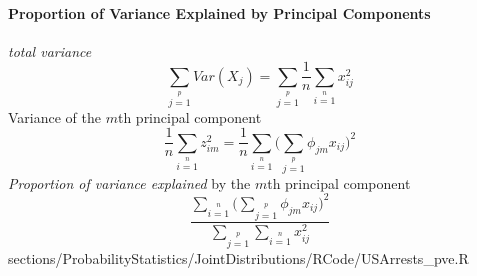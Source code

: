 {	\paragraph{Proportion of Variance Explained by Principal Components}
	\RTheory
	{
	\textit{total variance}
	$$
	\sum\limits_{j=1}\limits^{p} Var(X_j)=\sum\limits_{j=1}\limits^{p}\frac{1}{n}\sum\limits_{i=1}\limits^{n}x_{ij}^2
	$$	
	Variance of the $m$th principal component
	$$
	\frac{1}{n}\sum\limits_{i=1}\limits^{n}z_{im}^2=\frac{1}{n}\sum\limits_{i=1}\limits^{n}\bigg(\sum\limits_{j=1}\limits^{p}\phi_{jm}x_{ij}\bigg)^2
	$$
	\textit{Proportion of variance explained} by the $m$th principal component
	$$
		\frac{\sum\limits_{i=1}\limits^{n}\bigg(\sum\limits_{j=1}\limits^{p}\phi_{jm}x_{ij}\bigg)^2}{\sum\limits_{j=1}\limits^{p}\sum\limits_{i=1}\limits^{n}x_{ij}^2}
	$$
	}
	{sections/ProbabilityStatistics/JointDistributions/RCode/USArrests_pve.R}

	


}
